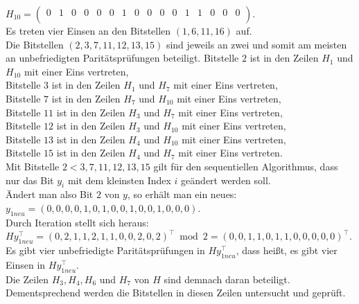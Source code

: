 \begin{Beispiel}
    $H_{10}= \left( \begin{array}{rrrrrrrrrrrrrrrr}
        0 & 1 & 0 & 0 & 0 & 0 & 1 & 0 & 0 & 0 & 0 & 1 & 1 & 0 & 0 & 0 \\
       \end{array}\right). 
    $\\
    Es treten vier Einsen an den Bitstellen $(1, 6, 11, 16)$ auf.\\
    
    
    Die Bitstellen $(2, 3, 7, 11, 12, 13, 15)$ sind jeweils an zwei und somit am meisten an unbefriedigten Paritätsprüfungen beteiligt.
    Bitstelle $2$ ist in den Zeilen $H_1$ und $H_{10}$ mit einer Eins vertreten,\\
    Bitstelle $3$ ist in den Zeilen $H_1$ und $H_7$ mit einer Eins vertreten,\\
    Bitstelle $7$ ist in den Zeilen $H_7$ und $H_{10}$ mit einer Eins vertreten,\\
    Bitstelle $11$ ist in den Zeilen $H_3$ und $H_7$ mit einer Eins vertreten,\\
    Bitstelle $12$ ist in den Zeilen $H_3$ und $H_{10}$ mit einer Eins vertreten,\\
    Bitstelle $13$ ist in den Zeilen $H_4$ und $H_{10}$ mit einer Eins vertreten,\\
    Bitstelle $15$ ist in den Zeilen $H_4$ und $H_7$ mit einer Eins vertreten.\\
    Mit Bitstelle $2 < 3, 7, 11, 12, 13, 15$ gilt für den sequentiellen Algorithmus, dass nur das Bit $y_i$ mit dem kleinsten Index $i$ geändert werden soll.\\
    
    Ändert man also Bit $2$ von $y$, so erhält man ein neues:\\
    $y_{1neu} = (0,0,0,0,1,0,1,0,0,1,0,0,1,0,0,0).$\\
    
    Durch Iteration stellt sich heraus:\\
    $Hy_{1neu}^\intercal = (0,2,1,1,2,1,1,0,0,2,0,2)^\intercal \bmod 2 = (0,0,1,1,0,1,1,0,0,0,0,0)^\intercal$.\\
    
    Es gibt vier unbefriedigte Paritätsprüfungen in $Hy_{1neu}^\intercal$, 
    dass hei\ss{}t, es gibt vier Einsen in $Hy_{1neu}^\intercal.$\\
    Die Zeilen $H_3, H_4, H_6$ und $H_7$ von $H$ sind demnach daran beteiligt.\\ 
    Dementsprechend werden die Bitstellen in diesen Zeilen untersucht und geprüft.\\
    

\end{Beispiel}
